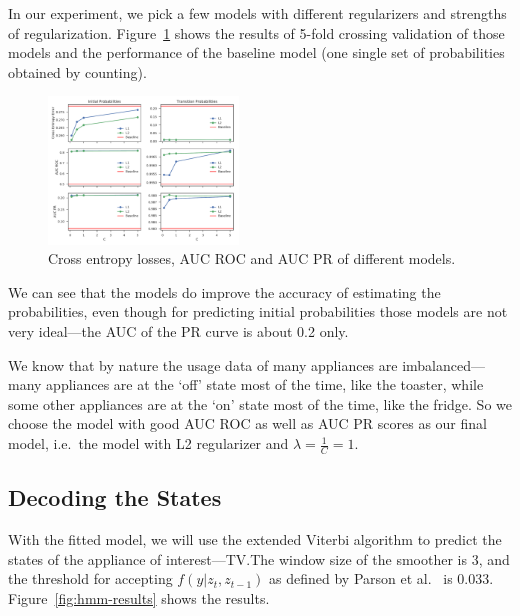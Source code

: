 \documentclass[sigconf]{acmart}
\begin{document}
In our experiment, we pick a few models with different regularizers
and strengths of regularization. Figure~\ref{fig:softmax-metrics}
shows the results of 5-fold crossing validation of those models and
the performance of the baseline model (one single set of probabilities
obtained by counting).

\begin{figure}[ht]
  \centering
  \includegraphics[width=0.45\textwidth]{figures/softmax-metrics}
  \caption{\label{fig:softmax-metrics} Cross entropy losses, AUC ROC
    and AUC PR of different models.}
\end{figure}

We can see that the models do improve the accuracy of estimating the
probabilities, even though for predicting initial probabilities those
models are not very ideal---the AUC of the PR curve is about 0.2 only.

We know that by nature the usage data of many appliances are
imbalanced---many appliances are at the `off' state most of the time,
like the toaster, while some other appliances are at the `on' state
most of the time, like the fridge. So we choose the model with good
AUC ROC as well as AUC PR scores as our final model, i.e.\ the model
with L2 regularizer and $\lambda = \frac{1}{C} = 1$.

\subsection{Decoding the States}

With the fitted model, we will use the extended Viterbi algorithm to
predict the states of the appliance of interest---TV.\@ The window
size of the smoother is 3, and the threshold for accepting
$f(y|z_{t}, z_{t - 1})$ as defined by Parson et
al.~\cite{parson2012non} is 0.033. Figure~\ref{fig:hmm-results} shows
the results.
\end{document}
